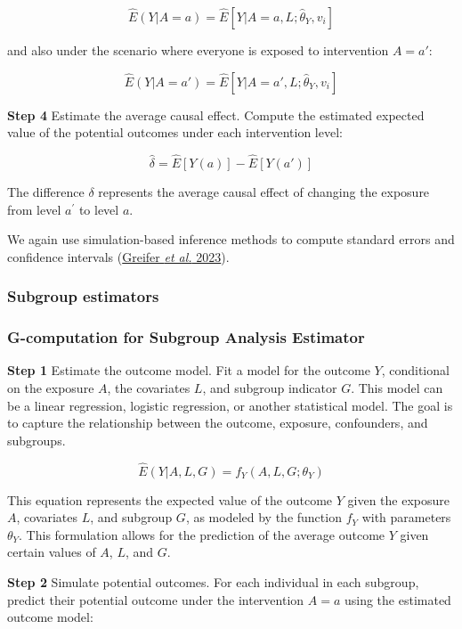 \documentclass[
  singlecolumn]{article}
\begin{document}
\[\hat{E}(Y|A=a)  = \hat{E}[Y|A=a,L; \hat{\theta}_Y, v_i]\]

and also under the scenario where everyone is exposed to intervention
\(A=a'\):

\[\hat{E}(Y|A=a')  = \hat{E}[Y|A=a',L; \hat{\theta}_Y, v_i]\]

\textbf{Step 4} Estimate the average causal effect. Compute the
estimated expected value of the potential outcomes under each
intervention level:

\[\hat{\delta} = \hat{E}[Y(a)] - \hat{E}[Y(a')]\]

The difference \(\delta\) represents the average causal effect of
changing the exposure from level \(a^{\prime}\) to level \(a\).

We again use simulation-based inference methods to compute standard
errors and confidence intervals
(\protect\hyperlink{ref-greifer2023}{Greifer \emph{et al.} 2023}).

\hypertarget{subgroup-estimators}{%
\subsubsection{Subgroup estimators}\label{subgroup-estimators}}

\hypertarget{g-computation-for-subgroup-analysis-estimator}{%
\subsubsection{\texorpdfstring{\textbf{G-computation for Subgroup
Analysis
Estimator}}{G-computation for Subgroup Analysis Estimator}}\label{g-computation-for-subgroup-analysis-estimator}}

\textbf{Step 1} Estimate the outcome model. Fit a model for the outcome
\(Y\), conditional on the exposure \(A\), the covariates \(L\), and
subgroup indicator \(G\). This model can be a linear regression,
logistic regression, or another statistical model. The goal is to
capture the relationship between the outcome, exposure, confounders, and
subgroups.

\[ \hat{E}(Y|A,L,G) = f_Y(A,L,G; \theta_Y) \]

This equation represents the expected value of the outcome \(Y\) given
the exposure \(A\), covariates \(L\), and subgroup \(G\), as modeled by
the function \(f_Y\) with parameters \(\theta_Y\). This formulation
allows for the prediction of the average outcome \(Y\) given certain
values of \(A\), \(L\), and \(G\).

\textbf{Step 2} Simulate potential outcomes. For each individual in each
subgroup, predict their potential outcome under the intervention \(A=a\)
using the estimated outcome model:
\end{document}
